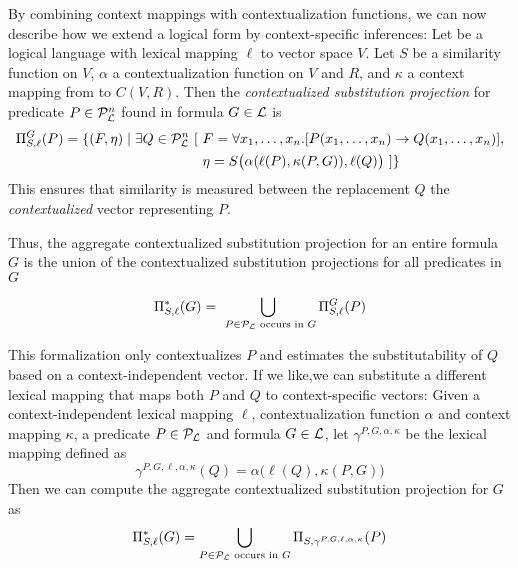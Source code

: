 By combining context mappings with contextualization functions, we can now
describe how we extend a logical form by context-specific inferences: Let
\loglang be a logical language with lexical mapping $\ell$ to vector space $V$.
Let $S$ be a similarity function on $V$, $\alpha$ a contextualization function
on $V$ and $R$, and $\kappa$ a context mapping from \loglang to $C(V, R)$.
Then the \textit{contextualized substitution projection} for predicate $P \in
{\cal{P}}_{{\cal{L}}}^n$ found in formula $G \in {\cal{L}}$ is
\begin{align*}
\Pi^G_{S, \ell}(P) = \{ (F, \eta) \mid \exists Q \in {\cal{P}}_{{\cal{L}}}^n~[ 
&~F = \forall x_1, \ldots, x_n.[P(x_1, \ldots, x_n) \to Q(x_1, \ldots, x_n)], \\
&~\eta = S\big(\alpha(\ell(P), \kappa(P, G)), \ell(Q)\big) ~] \}
\end{align*}
This ensures that similarity is measured between the replacement $Q$ the {\em contextualized}
vector representing $P$.

Thus, the aggregate contextualized substitution projection for an entire formula
$G$ is the union of the contextualized substitution projections for all
predicates in $G$

\[\Pi^*_{S, \ell}(G) = \bigcup_{~P \in {\cal{P}}_{{\cal{L}}} \text{ occurs in }
G} \Pi^G_{S, \ell}(P) \] 


This formalization only contextualizes $P$ and estimates the substitutability of
$Q$ based on a context-independent vector. If we like,we can substitute a
different lexical mapping that maps both $P$ and $Q$ to context-specific
vectors: Given a context-independent lexical mapping $\ell$, contextualization
function $\alpha$ and context mapping $\kappa$, a predicate $P \in
{\cal{P}}_{{\cal{L}}}$ and formula $G \in {\cal{L}}$, let $\gamma^{P, G, \alpha,
\kappa}$ be the lexical mapping defined as \[\gamma^{P, G, \ell, \alpha,
\kappa}(Q) = \alpha\big(\ell(Q), \kappa(P, G)\big) \] Then we can compute the
aggregate contextualized substitution projection for $G$ as \[\Pi^*_{S, \ell}(G)
= \bigcup_{P \in {\cal{P}}_{{\cal{L}}} \text{ occurs in } G} \Pi_{S, \gamma^{P, G, \ell, \alpha,
\kappa}}(P) \]

